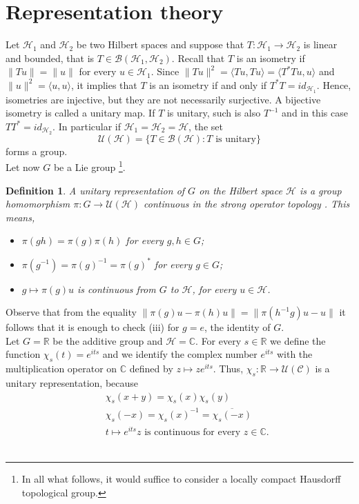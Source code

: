 \documentclass[a4paper,11pt]{article} %
\numberwithin{equation}{section} %
\numberwithin{figure}{section} %
\newtheorem{dfn}{Definition}
\begin{document}
\section{Representation theory}

Let  $\mathcal{H}_1$ and  $\mathcal{H}_2$ be two Hilbert spaces \cite[Def. 3.10, p. 101]{Moretti2012} and suppose that  $T:\mathcal{H}_1\rightarrow\mathcal{H}_2$ is  linear and bounded, that is $T\in\mathcal{B}(\mathcal{H}_1,\mathcal{H}_2)$. Recall that $T$ is an isometry if $\|Tu\|=\|u\|$ for every  $u\in\mathcal{H}_1$. Since $\|Tu\|^2=\langle Tu,Tu\rangle=\langle T^*Tu,u\rangle$ and $\|u\|^2=\langle u,u\rangle$, it implies that $T$ is an isometry if and only if  $T^*T=id_{\mathcal{H}_1}$. Hence, isometries are injective, but they are not necessarily surjective. A bijective isometry is called a unitary map. If $T$ is unitary, such is also $T^{-1}$ and in this case $TT^*=id_{\mathcal{H}_2}$. In particular if $\mathcal{H}_1=\mathcal{H}_2=\mathcal{H}$, the set
\begin{equation}
\mathcal{U}(\mathcal{H})=\big\{T\in\mathcal{B}(\mathcal{H}) : T \text{ is unitary}\big\} 
\end{equation}
forms a group.\\

Let now $G$ be a Lie group \footnote{In all what follows, it would suffice to consider a locally compact Hausdorff topological group.}.

\begin{dfn} 
A unitary representation of $G$ on the Hilbert space  $\mathcal{H}$ is a group homomorphism $\pi:G\rightarrow\mathcal{U}(\mathcal{H})$ continuous in the strong operator topology \cite[Def. 2.68, p. 67]{Moretti2012}. This means,
\begin{itemize}
\item[(i)] $\pi(gh)=\pi(g)\pi(h)$ for every  $g,h\in G$;
\item[(ii)] $\pi(g^{-1})=\pi(g)^{-1}=\pi(g)^*$  for every  $g\in G$;
\item[(iii)] $g\mapsto \pi(g)u$  is continuous from $G$ to  $\mathcal{H}$, for every $u\in\mathcal{H}$.
\end{itemize} 
\end{dfn}
Observe that from the equality $\|\pi(g)u-\pi(h)u\|=\|\pi(h^{-1}g)u-u\|$ it follows that it is enough to check (iii) for $g=e$,  the identity of $G$. \\

Let $G=\mathbb{R}$ be the additive group and $\mathcal{H}=\mathbb{C}$. For every  $s\in\mathbb{R}$ we define the function $\chi_s(t)=e^{its}$ and we identify the complex number $e^{its}$ with the multiplication operator on $\mathbb{C}$ defined by $z\mapsto ze^{its}$. Thus, $\chi_s:\mathbb{R}\rightarrow\mathcal{U}(\mathcal{C})$ is a unitary representation, because 
\begin{eqnarray}
&&\chi_s(x+y)=\chi_s(x)\chi_s(y)\\
&&\chi_s(-x)=\chi_s(x)^{-1}=\overline{\chi_s(-x)} \\
&&t\mapsto  e^{its}z\text{ is continuous for every }z\in\mathbb{C}.
\end{eqnarray} \\
\end{document}
